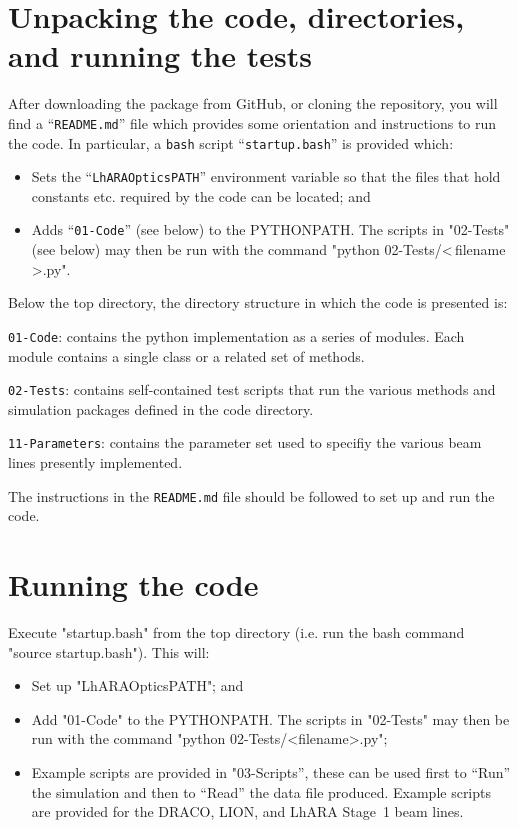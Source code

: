 \section*{Unpacking the code, directories, and running the tests}
After downloading the package from GitHub, or cloning the repository,
you will find a ``\verb+README.md+'' file which provides some orientation
and instructions to run the code.
In particular, a \verb+bash+ script ``\verb+startup.bash+'' is
provided which:
\begin{itemize}
  \item Sets the ``\verb+LhARAOpticsPATH+'' environment variable
    so that the files that hold constants etc. required by the code
    can be located; and
  \item Adds ``\verb+01-Code+'' (see below) to the PYTHONPATH.
    The scripts in "02-Tests" (see below) may then be run with the
    command "python 02-Tests/\textless\,filename\,\textgreater.py".
\end{itemize}
Below the top directory, the directory structure in which the code is
presented is:
\begin{description}
  \item\verb+01-Code+: contains the python implementation as a
    series of modules.
    Each module contains a single class or a related set of methods.
  \item\verb+02-Tests+: contains self-contained test scripts that
    run the various methods and simulation packages defined in the
    code directory.
  \item\verb+11-Parameters+: contains the parameter set used to 
    specifiy the various beam lines presently implemented.
\end{description}
The instructions in the \verb+README.md+ file should be followed to set
up and run the code.

\section*{Running the code}
Execute "startup.bash" from the top directory (i.e. run the bash
command "source startup.bash").  This will:
\begin{itemize}
  \item Set up "LhARAOpticsPATH"; and
  \item Add "01-Code" to the PYTHONPATH.  The scripts in "02-Tests"
    may then be run with the command "python 02-Tests/<filename>.py";
  \item Example scripts are provided in "03-Scripts'', these can be
    used first to ``Run'' the simulation and then to ``Read'' the data
    file produced.
    Example scripts are provided for the DRACO, LION, and LhARA
    Stage~1 beam lines.
\end{itemize}
